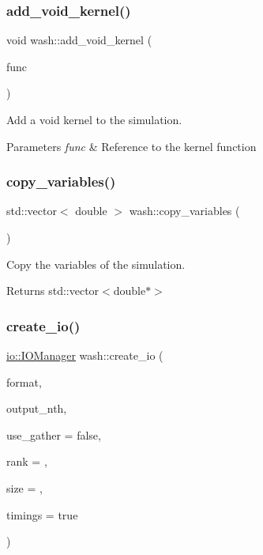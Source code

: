 \subsubsection{\texorpdfstring{add\+\_\+void\+\_\+kernel()}{add\_void\_kernel()}}
{\footnotesize\ttfamily void wash\+::add\+\_\+void\+\_\+kernel (\begin{DoxyParamCaption}\item[{const \mbox{\hyperlink{namespacewash_a7de7a4195ce994df4dd54ff86e3fff20}{Void\+FuncT}}}]{func }\end{DoxyParamCaption})}



Add a void kernel to the simulation. 


\begin{DoxyParams}{Parameters}
{\em func} & Reference to the kernel function \\
\hline
\end{DoxyParams}
\mbox{\label{namespacewash_afb1cc65bb4ecf6112723b4fb95450c96}} 
\subsubsection{\texorpdfstring{copy\+\_\+variables()}{copy\_variables()}}
{\footnotesize\ttfamily std\+::vector$<$ double $>$ wash\+::copy\+\_\+variables (\begin{DoxyParamCaption}{ }\end{DoxyParamCaption})}



Copy the variables of the simulation. 

\begin{DoxyReturn}{Returns}
std\+::vector$<$double$\ast$$>$ 
\end{DoxyReturn}
\mbox{\label{namespacewash_a92e4e768dbd609eba32fc0d68977d42f}} 
\subsubsection{\texorpdfstring{create\+\_\+io()}{create\_io()}}
{\footnotesize\ttfamily \mbox{\hyperlink{classwash_1_1io_1_1IOManager}{io\+::\+I\+O\+Manager}} wash\+::create\+\_\+io (\begin{DoxyParamCaption}\item[{const std\+::string}]{format,  }\item[{const size\+\_\+t}]{output\+\_\+nth,  }\item[{const bool}]{use\+\_\+gather = {\ttfamily false},  }\item[{const size\+\_\+t}]{rank = {},  }\item[{const size\+\_\+t}]{size = {},  }\item[{const bool}]{timings = {\ttfamily true} }\end{DoxyParamCaption})}



